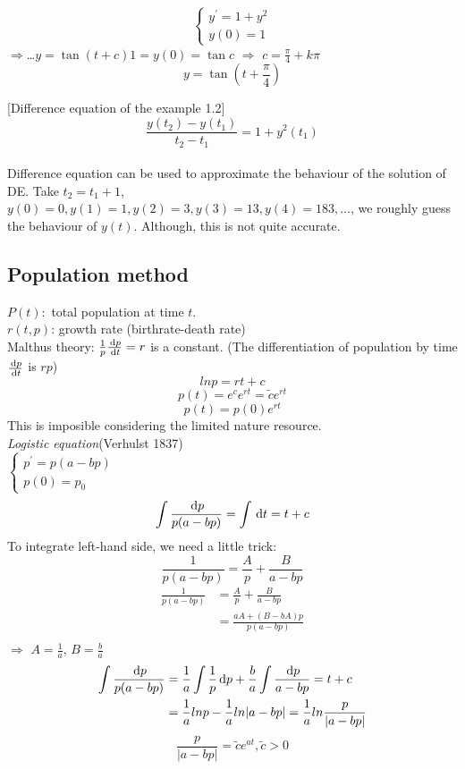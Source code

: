 \begin{example}

\[
\left \{	\begin{gathered}
y^\prime=1+y^2 	\\
y(0)=1
\end{gathered}	\right.
\]
$\Rightarrow$\qquad\dots$y=\tan(t+c)$\qquad$1=y(0)=\tan c$ $\Rightarrow$ $c=\frac{\pi}{4}+k\pi$\\
\[y=\tan(t+\frac{\pi}{4})\]
\end{example}
[Difference equation of the example 1.2]\[\frac{y(t_2)-y(t_1)}{t_2-t_1}=1+y^2(t_1)
\]\\Difference equation can be used to approximate the behaviour of the solution of DE.
Take $t_2=t_1+1$, $y(0)=0, y(1)=1, y(2)=3, y(3)=13, y(4)=183,\dots$, we roughly guess the behaviour of $y(t)$. Although, this is not quite accurate.
\subsection{Population method}
$P(t):$ total population at time $t$.\\
$r(t,p)$: growth rate (birthrate-death rate)\\
Malthus theory: $\frac{1}{p}\frac{\,\mathrm{d} p}{\,\mathrm{d} t}=r$
 is a constant. (The differentiation of population by time $\frac{\,\mathrm{d} p}{\,\mathrm{d} t}$ is $rp$)
\[lnp=rt+c\]
\[p(t)=e^ce^{rt}=\tilde{c}e^{rt}
\]
\[p(t)=p(0)e^{rt}
\]
This is imposible considering the limited nature resource.\\
\emph{Logistic equation}(Verhulst 1837)\\
$\left \{	\begin{gathered}
p^{\prime}=p(a-bp)	\\
p(0)=p_0
\end{gathered}\right.$
\[\int\frac{\,\mathrm{d} p}{p(a-bp)}=\int\,\mathrm{d} t=t+c
\]
To integrate left-hand side, we need a little trick:
\[\frac{1}{p(a-bp)}=\frac{A}{p}+\frac{B}{a-bp}
\]
\[
\begin{aligned}
	 \frac{1}{p(a-bp)}&=\frac{A}{p}+\frac{B}{a-bp}  \\
 		&=\frac{aA+(B-bA)p}{p(a-bp)}\\	
\end{aligned}
\]
$\Rightarrow$ $A=\frac{1}{a}$, $B=\frac{b}{a}$
\[
\begin{aligned}
	 \int\frac{\,\mathrm{d} p}{p(a-bp)}&=\frac{1}{a}\int\frac{1}{p}\,\mathrm{d} p+\frac{b}{a}\int\frac{\,\mathrm{d} p}{a-bp}=t+c  \\
 		&=\frac{1}{a}lnp-\frac{1}{a}ln|a-bp|=\frac{1}{a}ln\frac{p}{|a-bp|}\\	
\end{aligned}
\]
\[\boxed{\frac{p}{|a-bp|}=\tilde{c}e^{at}, \tilde{c}>0}\]





